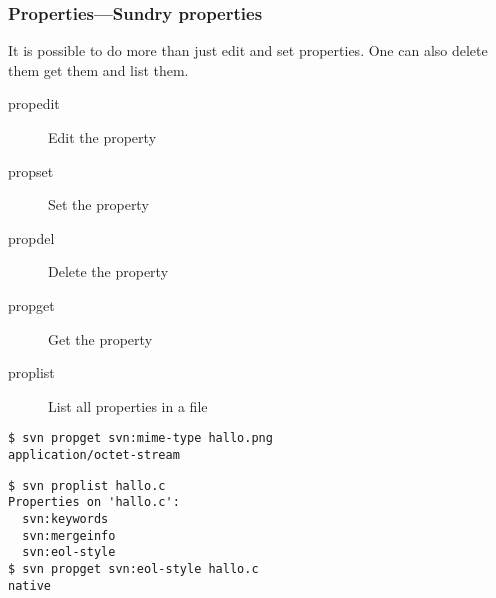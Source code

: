 \begin{frame}[fragile]
\frametitle{Properties---Sundry properties}

    It is possible to do more than just edit and set properties.  One can
    also delete them get them and list them.

    \begin{description}
        \item[propedit] Edit the property
        \item[propset] Set the property
        \item[propdel] Delete the property
        \item[propget] Get the property
        \item[proplist] List all properties in a file
    \end{description}

\begin{lstlisting}
$ svn propget svn:mime-type hallo.png
application/octet-stream
\end{lstlisting}

\begin{lstlisting}
$ svn proplist hallo.c
Properties on 'hallo.c':
  svn:keywords
  svn:mergeinfo
  svn:eol-style
$ svn propget svn:eol-style hallo.c
native
\end{lstlisting}

\end{frame}


